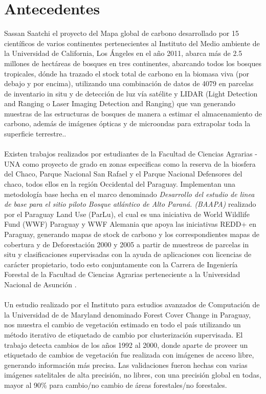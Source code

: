 \section{Antecedentes}\label{sec:antecedente}
	Sassan Saatchi\cite{saatchi2011benchmark} el proyecto del Mapa global de carbono desarrollado por 15 cient\'ificos de varios continentes pertenecientes al Instituto del Medio ambiente de la Universidad de California, Los \'Angeles en el a\~{n}o 2011, abarca m\'as de 2.5 millones de hect\'areas de bosques en tres continentes, abarcando todos los bosques tropicales, d\'onde ha trazado el stock total de carbono en la biomasa viva (por debajo y por encima), utilizando una combinaci\'on de datos de 4079 en parcelas de
	inventario in situ y de detecci\'on de luz v\'ia sat\'elite y LIDAR (Light Detection and Ranging o Laser Imaging Detection and
	Ranging) que van generando muestras de las estructuras de bosques de manera a estimar el almacenamiento de carbono,
	adem\'as de im\'agenes \'opticas y de microondas para extrapolar toda la superficie terrestre..\\~\\
	Existen trabajos realizados por estudiantes de la Facultad de Ciencias Agrarias - UNA como proyecto de grado en zonas especificas como la reserva de la biosfera del Chaco, Parque Nacional San Rafael y el Parque Nacional Defensores del chaco, todos ellos en la regi\'on Occidental del Paraguay. Implementan una metodolog\'ia base hecha en el marco denominado \textit{Desarrollo del estudio de linea de base para el sitio piloto Bosque atl\'antico de Alto Paran\'a. (BAAPA)} realizado por el Paraguay Land Use (ParLu), el cual es una iniciativa de World Wildlife Fund (WWF)	Paraguay y WWF Alemania que apoya las iniciativas REDD+ en Paraguay, generando mapas de stock de carbono y los correspondientes mapas de cobertura y de Deforestaci\'on 2000 y 2005 a partir de muestreos de parcelas in situ y clasificaciones supervisadas con la ayuda de aplicaciones con licencias de car\'acter propietario, todo esto conjuntamente con la  Carrera de Ingenier\'ia Forestal de la Facultad de Ciencias Agrarias perteneciente a la Universidad Nacional de Asunci\'on .\\~\\
	Un estudio realizado por el Instituto para estudios avanzados de Computaci\'on de la Universidad de de Maryland denominado Forest Cover Change in Paraguay, nos muestra el cambio de vegetaci\'on estimado en todo el pa\'is utilizando un m\'etodo iterativo de etiquetado de cambio por clusterizaci\'on supervisada. El trabajo detecta cambios de los a\~{n}os 1992 al 2000, donde aparte de proveer un etiquetado de cambios de vegetaci\'on fue realizada con im\'agenes de acceso libre, generando informaci\'on m\'as precisa. Las validaciones fueron hechas con varias im\'agenes satelitales de alta precisi\'on, no libres, con una precisi\'on global en todas, mayor al 90\% para cambio/no cambio de \'areas forestales/no forestales\cite{huang2009assessment}.

